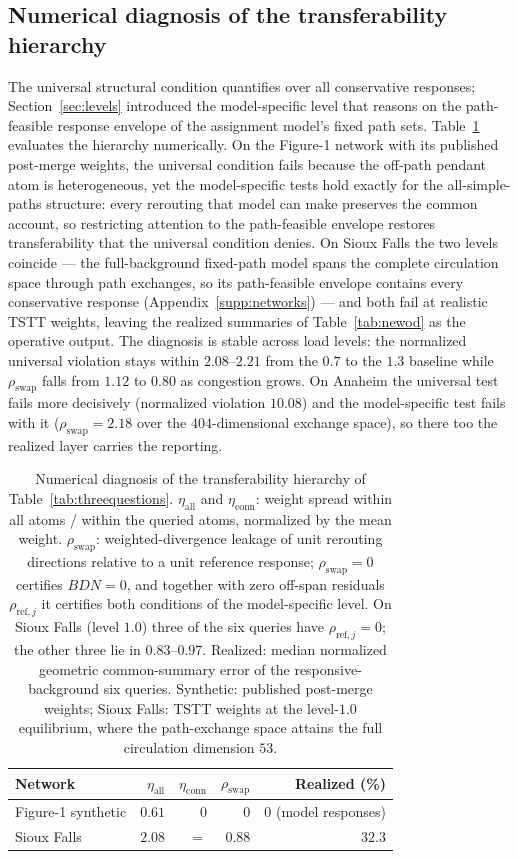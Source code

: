 \subsection{Numerical diagnosis of the transferability hierarchy}\label{supp:levelsdiag}
The universal structural condition quantifies over all conservative
responses; Section~\ref{sec:levels} introduced the model-specific level
that reasons on the path-feasible response envelope of the assignment
model's fixed path sets.
Table~\ref{tab:levelsdiag} evaluates the hierarchy numerically. On the
Figure-1 network with its published post-merge weights, the universal
condition fails because the off-path pendant atom is heterogeneous, yet
the model-specific tests hold exactly for the all-simple-paths
structure: every rerouting that model can make preserves the common
account, so restricting attention to the path-feasible envelope
restores transferability that the universal condition denies. On Sioux
Falls the two levels coincide --- the full-background fixed-path model
spans the complete circulation space through path exchanges, so its
path-feasible envelope contains every conservative response
(Appendix~\ref{supp:networks}) --- and both fail at realistic TSTT
weights, leaving the realized summaries of Table~\ref{tab:newod} as the
operative output. The diagnosis is stable across load levels: the
normalized universal violation stays within $2.08$--$2.21$ from the
$0.7$ to the $1.3$ baseline while $\rho_{\mathrm{swap}}$ falls from
$1.12$ to $0.80$ as congestion grows. On Anaheim the universal test
fails more decisively (normalized violation $10.08$) and the
model-specific test fails with it ($\rho_{\mathrm{swap}}=2.18$ over the
$404$-dimensional exchange space), so there too the realized layer
carries the reporting.

\begin{table}[t]\centering\footnotesize
\caption{Numerical diagnosis of the transferability hierarchy of
Table~\ref{tab:threequestions}. $\eta_{\mathrm{all}}$ and
$\eta_{\mathrm{conn}}$: weight spread within all atoms / within the
queried atoms, normalized by the mean weight. $\rho_{\mathrm{swap}}$:
weighted-divergence leakage of unit rerouting directions relative to a
unit reference response; $\rho_{\mathrm{swap}}=0$ certifies
$BDN=0$, and together with zero off-span residuals
$\rho_{\mathrm{ref},j}$ it certifies both conditions of the
model-specific level. On Sioux Falls (level $1.0$) three of the six
queries have $\rho_{\mathrm{ref},j}=0$; the other three lie in
$0.83$--$0.97$. Realized: median
normalized geometric common-summary error of the responsive-background six
queries. Synthetic: published post-merge weights; Sioux Falls: TSTT
weights at the level-$1.0$ equilibrium, where the path-exchange space
attains the full circulation dimension $53$.}\label{tab:levelsdiag}
\begin{tabular}{lrrrr}\toprule
Network & $\eta_{\mathrm{all}}$ & $\eta_{\mathrm{conn}}$ & $\rho_{\mathrm{swap}}$ & Realized (\%)\\\midrule
Figure-1 synthetic & $0.61$ & $0$ & $0$ & $0$ (model responses)\\
Sioux Falls & $2.08$ & $=$ & $0.88$ & $32.3$\\
\bottomrule\end{tabular}\end{table}
